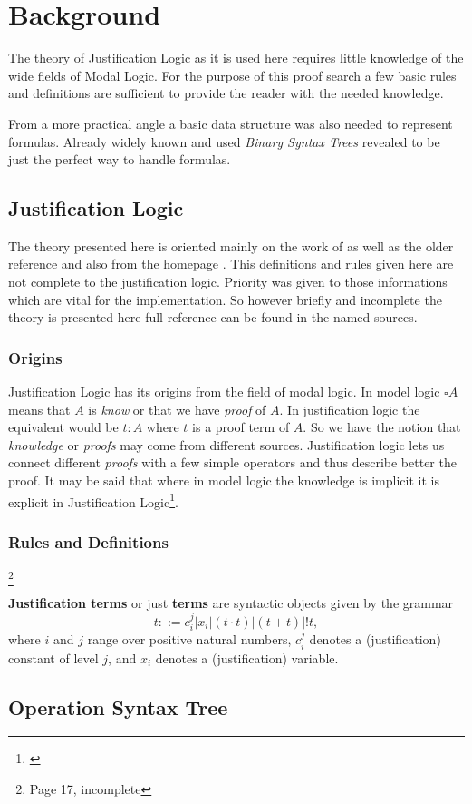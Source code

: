 \chapter{Background}
The theory of Justification Logic as it is used here requires little knowledge of the wide fields of Modal Logic. For the purpose of this proof search a few basic rules and definitions are sufficient to provide the reader with the needed knowledge. 
\par
From a more practical angle a basic data structure was also needed to represent formulas. Already widely known and used \emph{Binary Syntax Trees} revealed to be just the perfect way to handle formulas.

\section{Justification Logic}
 The theory presented here is oriented mainly on the work of \cite{goet} as well as the older reference \cite{art} and also from the homepage \cite{stan}. This definitions and rules given here are not complete to the justification logic. Priority was given to those informations which are vital for the implementation. So however briefly and incomplete the theory is presented here full reference can be found in the named sources. 

\subsection{Origins}
Justification Logic has its origins from the field of modal logic. 
In model logic $\square A$ means that $A$ is \emph{know} or that we have \emph{proof} of $A$. In justification logic the equivalent would be $t:A$ where $t$ is a proof term of $A$. So we have the notion that \emph{knowledge} or \emph{proofs} may come from different sources. Justification logic lets us connect different \emph{proofs} with a few simple operators and thus describe better the proof. It may be said that where in model logic the knowledge is implicit it is explicit in Justification Logic\footnote{\cite{goet}}.

\subsection{Rules and Definitions}

\begin{definition}\footnote{\cite{goet} Page 17, incomplete}

\textbf{Justification terms} or just \textbf{terms} are syntactic objects given by the grammar
\[
	t::= c_{i}^{j} | x_i | (t \cdot t) | (t+t) | !t,
\]
where $i$ and $j$ range over positive natural numbers, $c_{i}^{j}$ denotes a (justification) constant of level $j$, and $x_i$ denotes a (justification) variable.

\end{definition}


\section{Operation Syntax Tree}

